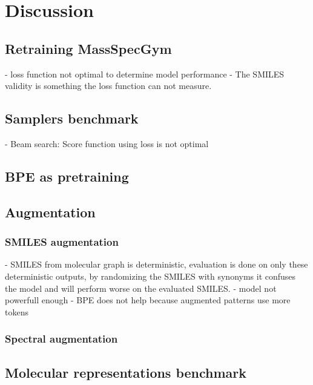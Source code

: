 \chapter{Discussion}
\label{chap:discussion}


\section{Retraining MassSpecGym}
- loss function not optimal to determine model performance
- The SMILES validity is something the loss function can not measure.

\section{Samplers benchmark}

- Beam search: Score function using loss is not optimal


\section{\ac{BPE} as pretraining}


\section{Augmentation}

\subsection{SMILES augmentation}
- SMILES from molecular graph is deterministic, evaluation is done on only these deterministic outputs, by randomizing the SMILES with synonyms it confuses the model and will perform worse on the evaluated SMILES.
- model not powerfull enough
- BPE does not help because augmented patterns use more tokens

\subsection{Spectral augmentation}


\section{Molecular representations benchmark}